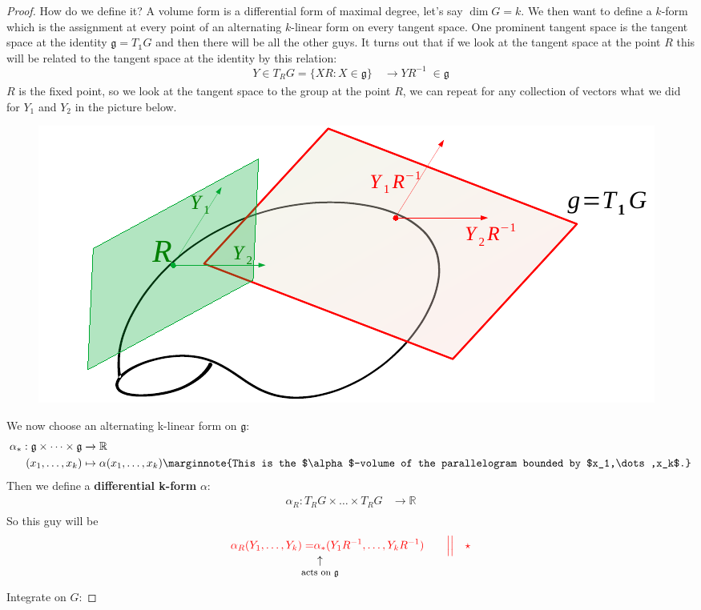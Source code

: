 \documentclass[../main.tex]{subfiles}
\begin{document}
\begin{proof}
How do we define it? A volume form is a differential form of maximal degree, let's say $\dim G=k$. We then want to define a $k$-form which is the assignment at every point of an alternating $k$-linear form on every tangent space. One prominent tangent space is the tangent space at the identity $\mathfrak{g}=T_{\mathbb{1}}G$ and then there will be all the other guys. It turns out that if we look at the tangent space at the point $R$ this will be related to the tangent space at the identity by this relation:
\[
Y\in T_RG=\{XR:X\in\mathfrak{g}\}\quad \xrightarrow[]{}YR^{-1}\;\in\mathfrak{g}
\]
$R$ is the fixed point, so we look at the tangent space to the group at the point $R$, we can repeat for any collection of vectors what we did for $Y_1$ and $Y_2$ in the picture below.
\begin{figure}[h!]
    \centering
    \includegraphics{images/tangentweyl.pdf}
    \caption*{}
\end{figure}

We now choose an alternating k-linear form on $\mathfrak{g}$:
\begin{align*}
    \alpha_*:\mathfrak{g}\times\dots\times\mathfrak{g}&\xrightarrow[]{}\mathbb{R}\\
    (x_1,\dots,x_k)&\mapsto\alpha(x_1,\dots,x_k)\marginnote{This is the $\alpha$-volume of the parallelogram bounded by $x_1,\dots,x_k$.}
\end{align*}
Then we define a \textbf{differential k-form} $\alpha$:
{\color{red}
\begin{align*}
    \alpha_R:T_RG\times\dots\times T_RG&\xrightarrow[]{}\mathbb{R}
\end{align*}
}
So this guy will be
\[
    {\color{red}\alpha_R(Y_1,\dots,Y_k)=}\underset{\mathclap{\tikz \node {$\uparrow$} node [below=1ex] {\footnotesize  acts on $\mathfrak{g}$};}}{{\color{red}\alpha_*}}{\color{red}(Y_1R^{-1},\dots,Y_kR^{-1}) \qquad \Big|\Big| \quad \star}
\]
 Integrate on $G$:


\end{proof}
\end{document}

